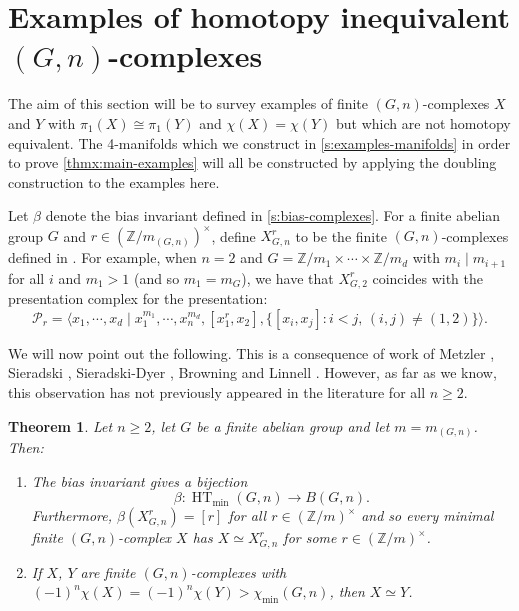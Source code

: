 \documentclass[11pt,a4paper,leqno]{amsart}
\newtheorem{theorem}{Theorem}[section]
\theoremstyle{definition}
\theoremstyle{remark}
\newenvironment{clist}[1]
{\begin{enumerate}[\normalfont #1]}
{\end{enumerate}}
\newcommand{\Z}{\mathbb{Z}}
\DeclareMathOperator{\HT}{HT}
\begin{document}
\section{Examples of homotopy inequivalent $(G,n)$-complexes} \label{s:examples-complexes}

The aim of this section will be to survey examples of finite $(G,n)$-complexes $X$ and $Y$ with $\pi_1(X) \cong \pi_1(Y)$ and $\chi(X)=\chi(Y)$ but which are not homotopy equivalent. The 4-manifolds which we construct in \cref{s:examples-manifolds} in order to prove \cref{thmx:main-examples}  will all be constructed by applying the doubling construction to the examples here.

Let $\beta$ denote the bias invariant defined in \cref{s:bias-complexes}. For a finite abelian group $G$ and $r \in (\Z/m_{(G,n)})^\times$, define $X^r_{G,n}$ to be the finite $(G,n)$-complexes defined in \cite[Proof of Proposition 6]{Sieradski:1979}. For example, when $n=2$ and $G = \Z/{m_1} \times \cdots \times \Z/{m_d}$ with $m_i \mid m_{i+1}$ for all $i$ and $m_1 > 1$ (and so $m_1 = m_G$), we have that $X^r_{G,2}$ coincides with the presentation complex for the presentation:
\[ \mathcal{P}_r = \langle x_1, \cdots, x_d \mid x_1^{m_1}, \cdots, x_n^{m_d}, [x_1^r,x_2], \{[x_i,x_j]\colon i<j, \, (i,j) \ne (1,2)\} \rangle. \]

We will now point out the following. This is a consequence of work of Metzler \cite{Metzler:1976}, Sieradski \cite{Sieradski:1977}, Sieradski-Dyer \cite{Sieradski:1979}, Browning \cite{Browning:1979c,Browning:1979} and Linnell \cite{Linnell:1993}. However, as far as we know, this observation has not previously appeared in the literature for all $n \ge 2$.

\begin{theorem} \label{thm:bias-surj-abelian}
Let $n \ge 2$, let $G$ be a finite abelian group and let $m = m_{(G,n)}$. Then:
\begin{clist}{(i)}
\item
The bias invariant gives a bijection
\[ \beta\colon \HT_{\min}(G,n) \to B(G,n).\]
Furthermore, $\beta(X^r_{G,n}) = [r]$ for all $r \in (\Z/m)^\times$ and so every minimal finite $(G,n)$-complex $X$ has $X \simeq X^r_{G,n}$ for some $r \in (\Z/m)^\times$.
\item
If $X$, $Y$ are finite $(G,n)$-complexes with $(-1)^n\chi(X)=(-1)^n\chi(Y)>\chi_{\min}(G,n)$, then $X \simeq Y$.
\end{clist}
\end{theorem}
\end{document}
